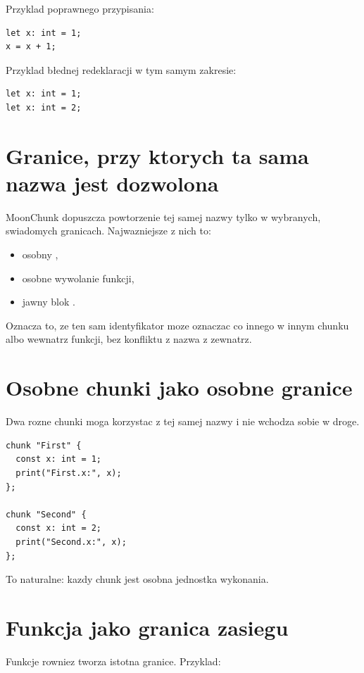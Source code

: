 Przyklad poprawnego przypisania:

\begin{lstlisting}[style=moonchunk,caption={Zmiana wartosci przez przypisanie}]
let x: int = 1;
x = x + 1;
\end{lstlisting}

Przyklad błednej redeklaracji w tym samym zakresie:

\begin{lstlisting}[style=moonchunk,caption={Bledna redeklaracja w tym samym miejscu}]
let x: int = 1;
let x: int = 2;
\end{lstlisting}

\section{Granice, przy ktorych ta sama nazwa jest dozwolona}
MoonChunk dopuszcza powtorzenie tej samej nazwy tylko w wybranych, swiadomych granicach.
Najwazniejsze z nich to:

\begin{itemize}
  \item osobny ,
  \item osobne wywolanie funkcji,
  \item jawny blok .
\end{itemize}

Oznacza to, ze ten sam identyfikator moze oznaczac co innego w innym chunku albo wewnatrz
funkcji, bez konfliktu z nazwa z zewnatrz.

\section{Osobne chunki jako osobne granice}
Dwa rozne chunki moga korzystac z tej samej nazwy i nie wchodza sobie w droge.

\begin{lstlisting}[style=moonchunk,caption={Ta sama nazwa w dwoch chunkach}]
chunk "First" {
  const x: int = 1;
  print("First.x:", x);
};

chunk "Second" {
  const x: int = 2;
  print("Second.x:", x);
};
\end{lstlisting}

To naturalne: kazdy chunk jest osobna jednostka wykonania.

\section{Funkcja jako granica zasiegu}
Funkcje rowniez tworza istotna granice. Przyklad:

